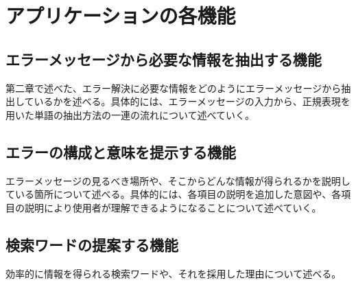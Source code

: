 \documentclass[main]{subfiles}
\begin{document}
\chapter{アプリケーションの各機能}
\section{エラーメッセージから必要な情報を抽出する機能}
第二章で述べた、エラー解決に必要な情報をどのようにエラーメッセージから抽出しているかを述べる。具体的には、エラーメッセージの入力から、正規表現を用いた単語の抽出方法の一連の流れについて述べていく。

\section{エラーの構成と意味を提示する機能}
エラーメッセージの見るべき場所や、そこからどんな情報が得られるかを説明している箇所について述べる。具体的には、各項目の説明を追加した意図や、各項目の説明により使用者が理解できるようになることについて述べていく。

\section{検索ワードの提案する機能}
効率的に情報を得られる検索ワードや、それを採用した理由について述べる。
\end{document}
